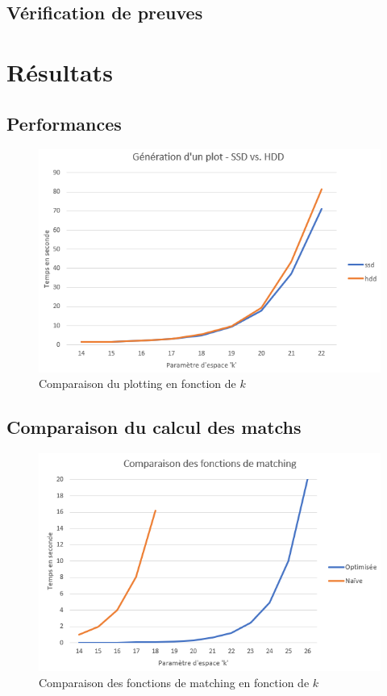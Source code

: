 \subsection{Vérification de preuves}

\lipsum[1]

\section{Résultats}

\lipsum[1]

\subsection{Performances}

\begin{figure}[H]
  \centering
  \includegraphics[width=13cm]{images/bench_ssd_hdd.png}
  \caption{Comparaison du plotting en fonction de $k$}
\end{figure}

\subsection{Comparaison du calcul des matchs}

\begin{figure}[H]
  \centering
  \includegraphics[width=14cm]{images/bench_matching.png}
  \caption{Comparaison des fonctions de matching en fonction de $k$}
\end{figure}


